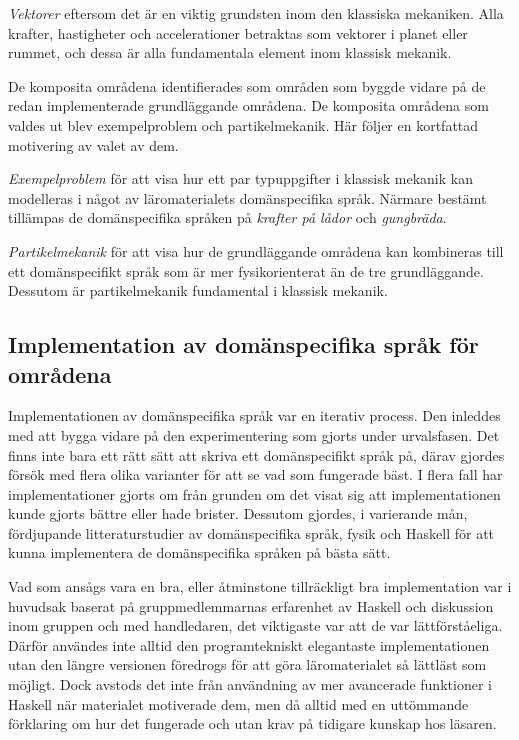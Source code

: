 \textit{Vektorer} eftersom det är en viktig grundsten inom den klassiska
mekaniken. Alla krafter, hastigheter och accelerationer betraktas som vektorer i
planet eller rummet, och dessa är alla fundamentala element inom klassisk
mekanik.

De komposita områdena identifierades som områden som byggde vidare på de redan
implementerade grundläggande områdena. De komposita områdena som valdes ut
blev exempelproblem och partikelmekanik. Här följer en kortfattad motivering av valet av dem.

\textit{Exempelproblem} för att visa hur ett par typuppgifter i klassisk mekanik kan modelleras i något av läromaterialets domänspecifika språk. Närmare bestämt tillämpas de domänspecifika språken på \textit{krafter på lådor} och \textit{gungbräda}.

\textit{Partikelmekanik} för att visa hur de grundläggande områdena kan kombineras till ett domänspecifikt språk som är mer fysikorienterat än de tre grundläggande. Dessutom är partikelmekanik fundamental i klassisk mekanik.

\subsection{Implementation av domänspecifika språk för områdena}

Implementationen av domänspecifika språk var en iterativ process.
Den inleddes med att
bygga vidare på den experimentering som gjorts under urvalsfasen. Det finns inte bara
ett rätt sätt att skriva ett domänspecifikt språk på, därav gjordes försök med
flera olika varianter för att se vad som fungerade bäst.  I flera fall har implementationer gjorts om från grunden om
det visat sig att implementationen kunde gjorts bättre eller
hade brister. Dessutom gjordes, i varierande mån, fördjupande litteraturstudier av domänspecifika
språk, fysik och Haskell för att kunna implementera de domänspecifika språken på bästa sätt.

Vad som ansågs vara en bra, eller åtminstone tillräckligt bra implementation
var i huvudsak baserat på gruppmedlemmarnas erfarenhet av Haskell och diskussion
inom gruppen och med handledaren, det viktigaste var att de var
lättförståeliga. Därför användes inte alltid den programtekniskt elegantaste
implementationen utan den längre versionen föredrogs för att göra
läromaterialet så lättläst som möjligt. Dock avstods det inte från användning av
mer avancerade funktioner i Haskell när materialet motiverade dem, men då alltid
med en uttömmande förklaring om hur det fungerade och utan krav på tidigare
kunskap hos läsaren.

